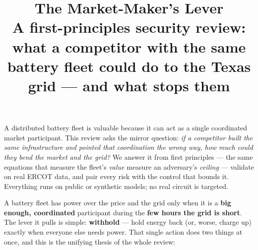 \documentclass[11pt]{article}
\title{\vspace{-1.2cm}\bfseries The Market-Maker's Lever\\[3pt]
\large A first-principles security review: what a competitor with the same
battery fleet could do to the Texas grid --- and what stops them}
\author{}
\date{}
\newcommand{\qsec}[1]{\vspace{4pt}\noindent{\large\bfseries\color{baseblue} #1}\par\vspace{2pt}}
\begin{document}
\maketitle
\vspace{-1.2cm}

\begin{center}
\begin{tcolorbox}[colback=gray!5,colframe=gray!55,width=0.97\linewidth,boxrule=0.5pt,arc=2pt]
\small A distributed battery fleet is valuable because it can act as a single
coordinated market participant. This review asks the mirror question: \emph{if a
competitor built the same infrastructure and pointed that coordination the wrong
way, how much could they bend the market and the grid?} We answer it from first
principles --- the same equations that measure the fleet's \emph{value} measure an
adversary's \emph{ceiling} --- validate on real ERCOT data, and pair every risk
with the control that bounds it. Everything runs on public or synthetic models;
no real circuit is targeted.
\end{tcolorbox}
\end{center}

\qsec{The whole argument in one idea}

A battery fleet has power over the price and the grid only when it is a
\textbf{big enough, coordinated} participant during the \textbf{few hours the grid
is short}. The lever it pulls is simple: \textbf{withhold} --- hold energy back
(or, worse, charge up) exactly when everyone else needs power. That single action
does two things at once, and this is the unifying thesis of the whole review:

\begin{center}
\end{center}
\end{document}
